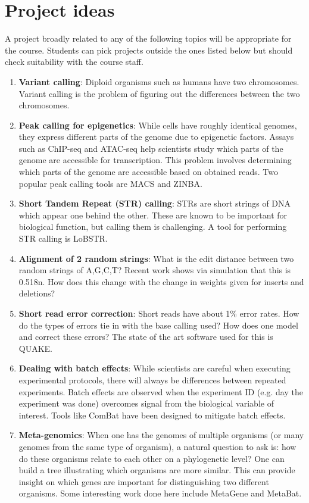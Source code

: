 \documentclass[11pt,onecolumn]{article}
\begin{document}
\section{Project ideas}
A project broadly related to any of the following topics will be  appropriate for the course. Students can pick projects outside the ones listed below 
but should check suitability with the course staff.

\begin{enumerate}
	\item \textbf{Variant calling}: Diploid organisms such as humans have two chromosomes. Variant calling is the problem of figuring out the differences between the two chromosomes.
	\item \textbf{Peak calling for epigenetics}: While cells have roughly identical genomes, they express different parts of the genome due to epigenetic factors. Assays such as ChIP-seq and ATAC-seq help scientists study which parts of the genome are accessible for transcription. This problem involves determining which parts of the genome are accessible based on obtained reads. Two popular peak calling tools are MACS and ZINBA.
	\item \textbf{Short Tandem Repeat (STR) calling}: STRs are short strings of DNA which appear one behind the other. These are known to be important for biological function, but calling them is challenging. A tool for performing STR calling is LoBSTR.
	\item \textbf{Alignment of 2 random strings}: What is the edit distance between two random strings of A,G,C,T? Recent work shows via simulation that this is 0.518n. How does this change with the change in weights given for inserts and deletions?
	\item \textbf{Short read error correction}: Short reads have about 1\% error rates. How do the types of errors tie in with the base calling used? How does one model and correct these errors? The state of the art software used for this is QUAKE.
	\item \textbf{Dealing with batch effects}: While scientists are careful when executing experimental protocols, there will always be differences between repeated experiments. Batch effects are observed when the experiment ID (e.g. day the experiment was done) overcomes signal from the biological variable of interest. Tools like ComBat have been designed to mitigate batch effects.
	\item \textbf{Meta-genomics}: When one has the genomes of multiple organisms (or many genomes from the same type of organism), a natural question to ask is: how do these organisms relate to each other on a phylogenetic level? One can build a tree illustrating which organisms are more similar. This can provide insight on which genes are important for distinguishing two different organisms. Some interesting work done here include MetaGene and MetaBat.

\end{enumerate}
\end{document}
